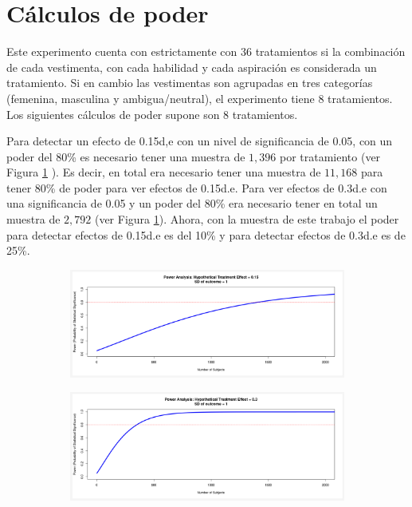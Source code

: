 \section{Cálculos de poder}
Este experimento cuenta con estrictamente con 36 tratamientos si la combinación de cada vestimenta, con cada habilidad y cada aspiración es considerada un tratamiento. Si en cambio las vestimentas son agrupadas en tres categorías (femenina, masculina y ambigua/neutral), el experimento tiene 8 tratamientos. Los siguientes cálculos de poder supone son 8 tratamientos. 

Para detectar un efecto de 0.15d,e con un nivel de significancia de 0.05, con un poder del 80\% es necesario tener una muestra de $1,396$ por tratamiento (ver Figura \ref{fig:calc} ). Es decir, en total era necesario tener una muestra de $11,168$ para tener 80\% de poder para ver efectos de 0.15d.e. Para ver efectos de 0.3d.e con una significancia de 0.05 y un poder del 80\% era necesario tener en total un muestra de $2,792$ (ver Figura \ref{fig:calc}). Ahora, con la muestra de este trabajo el poder para detectar efectos de 0.15d.e es del 10\% y para detectar efectos de 0.3d.e es de 25\%.

\begin{figure}[!ht]
    \centering
    \caption{Cálculos de poder}
    \begin{subfigure}{\textwidth}
        \centering
        \includegraphics[width=13cm]{Images/pc_15.png}
    \end{subfigure}
    \begin{subfigure}{\textwidth} 
        \centering
        \includegraphics[width=13cm]{Images/pc_30.png}
    \end{subfigure}
    \label{fig:calc}
    \begin{singlespace}
    \end{singlespace}
\end{figure}

